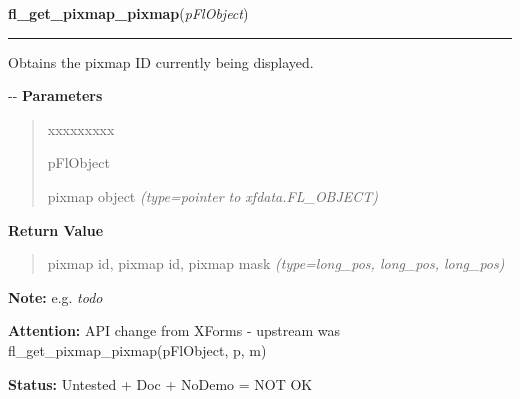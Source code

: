 \hspace{.8\funcindent}\begin{boxedminipage}{\funcwidth}

    \raggedright \textbf{fl\_get\_pixmap\_pixmap}(\textit{pFlObject})

    \vspace{-1.5ex}

    \rule{\textwidth}{0.5\fboxrule}
\setlength{\parskip}{2ex}

Obtains the pixmap ID currently being displayed.

-{}-
\setlength{\parskip}{1ex}
      \textbf{Parameters}
      \vspace{-1ex}

      \begin{quote}
        \begin{Ventry}{xxxxxxxxx}

          \item[pFlObject]


pixmap object
            {\it (type=pointer to xfdata.FL\_OBJECT)}

        \end{Ventry}

      \end{quote}

      \textbf{Return Value}
    \vspace{-1ex}

      \begin{quote}

pixmap id, pixmap id, pixmap mask
      {\it (type=long\_pos, long\_pos, long\_pos)}

      \end{quote}

\textbf{Note:} 
e.g. \emph{todo}


\textbf{Attention:} 
API change from XForms - upstream was
fl\_get\_pixmap\_pixmap(pFlObject, p, m)


\textbf{Status:} 
Untested + Doc + NoDemo = NOT OK


    \end{boxedminipage}

    \label{xformslib:flbitmap:fl_get_pixmap_pixmap}

    \vspace{0.5ex}


